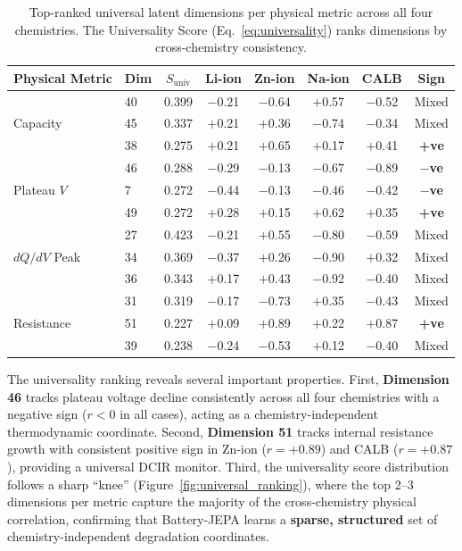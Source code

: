 \documentclass[a4paper,fleqn]{cas-dc}
\begin{document}
\begin{table}[t]
\caption{Top-ranked universal latent dimensions per physical metric across all four chemistries. The Universality Score (Eq.~\ref{eq:universality}) ranks dimensions by cross-chemistry consistency.}
\label{tbl:universal_dims}
\centering
\footnotesize
\begin{tabular}{llcccccc}
\toprule
Physical Metric & Dim & $S_{\text{univ}}$ & Li-ion & Zn-ion & Na-ion & CALB & Sign \\
\midrule
\multirow{3}{*}{Capacity} & 40 & 0.399 & $-$0.21 & $-$0.64 & $+$0.57 & $-$0.52 & Mixed \\
 & 45 & 0.337 & $+$0.21 & $+$0.36 & $-$0.74 & $-$0.34 & Mixed \\
 & 38 & 0.275 & $+$0.21 & $+$0.65 & $+$0.17 & $+$0.41 & \textbf{+ve} \\
\midrule
\multirow{3}{*}{Plateau $V$} & 46 & 0.288 & $-$0.29 & $-$0.13 & $-$0.67 & $-$0.89 & \textbf{$-$ve} \\
 & 7 & 0.272 & $-$0.44 & $-$0.13 & $-$0.46 & $-$0.42 & \textbf{$-$ve} \\
 & 49 & 0.272 & $+$0.28 & $+$0.15 & $+$0.62 & $+$0.35 & \textbf{+ve} \\
\midrule
\multirow{3}{*}{$dQ/dV$ Peak} & 27 & 0.423 & $-$0.21 & $+$0.55 & $-$0.80 & $-$0.59 & Mixed \\
 & 34 & 0.369 & $-$0.37 & $+$0.26 & $-$0.90 & $+$0.32 & Mixed \\
 & 36 & 0.343 & $+$0.17 & $+$0.43 & $-$0.92 & $-$0.40 & Mixed \\
\midrule
\multirow{3}{*}{Resistance} & 31 & 0.319 & $-$0.17 & $-$0.73 & $+$0.35 & $-$0.43 & Mixed \\
 & 51 & 0.227 & $+$0.09 & $+$0.89 & $+$0.22 & $+$0.87 & \textbf{+ve} \\
 & 39 & 0.238 & $-$0.24 & $-$0.53 & $+$0.12 & $-$0.40 & Mixed \\
\bottomrule
\end{tabular}
\end{table}

The universality ranking reveals several important properties. First, \textbf{Dimension 46} tracks plateau voltage decline consistently across all four chemistries with a negative sign ($r < 0$ in all cases), acting as a chemistry-independent thermodynamic coordinate. Second, \textbf{Dimension 51} tracks internal resistance growth with consistent positive sign in Zn-ion ($r = +0.89$) and CALB ($r = +0.87$), providing a universal DCIR monitor. Third, the universality score distribution follows a sharp ``knee'' (Figure~\ref{fig:universal_ranking}), where the top 2--3 dimensions per metric capture the majority of the cross-chemistry physical correlation, confirming that Battery-JEPA learns a \textbf{sparse, structured} set of chemistry-independent degradation coordinates.
\end{document}
